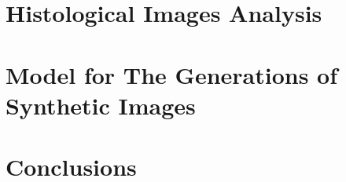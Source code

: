 \documentclass[12pt,a4paper]{report}
\begin{document}




\tableofcontents{}


\clearpage

\chapter{Histological Images Analysis}
    
    \clearpage
    
    \clearpage
    
    \clearpage

\chapter{Model for The Generations of Synthetic Images}
    
    \clearpage
    
    \clearpage
    
    \clearpage
    
\chapter{Conclusions}
    
    \clearpage


\end{document}
